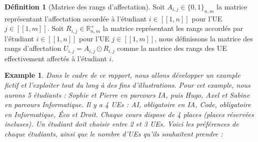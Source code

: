 \documentclass{rapport}
\theoremstyle{definition}
\newtheorem{definition}{Définition}
\theoremstyle{remark}
\theoremstyle{plain}
\newtheorem{example}{Example}
\theoremstyle{definition}
\theoremstyle{remark}
\newcommand{\llbracket}{[\![}
\newcommand{\rrbracket}{]\!]}
\begin{document}
\begin{definition}[Matrice des rangs d'affectation]
    Soit $A_{i,j}\in\{0,1\}_{n,m}$ la matrice représentant l'affectation accordée à l'étudiant $i\in\llbracket 1,n\rrbracket$ pour l'UE $j\in\llbracket 1,m\rrbracket$.
    Soit $R_{i,j}\in\mathbb{R}^{+}_{n,m}$ la matrice représentant les rangs accordés par l'étudiant $i\in\llbracket 1,n\rrbracket$ pour l'UE $j\in\llbracket 1,m\rrbracket$, nous
    définissons la matrice des rangs d'affectation $U_{i,j} = A_{i,j} \odot R_{i,j}$ comme la matrice des rangs des UE effectivement affectés à l'étudiant $i$.
\end{definition}

\begin{example}\label{ex:running1}
    Dans le cadre de ce rapport, nous allons développer un example fictif et l'exploiter tout du long à des fins d'illustrations.
    Pour cet example, nous aurons 5 étudiants : Sophie et Pierre en parcours IA, puis Hugo, Axel et Sabine en parcours Informatique.
    Il y a 4 UEs : AI, obligatoire en IA, Code, obligatoire en Informatique, Éco et Droit. Chaque cours dispose de 4 places (places réservées incluses).
    Un étudiant doit choisir entre 2 et 3 UEs. Voici les préférences de chaque étudiants, ainsi que le nombre d'UEs qu'ils souhaitent prendre :


\end{example}
\end{document}
